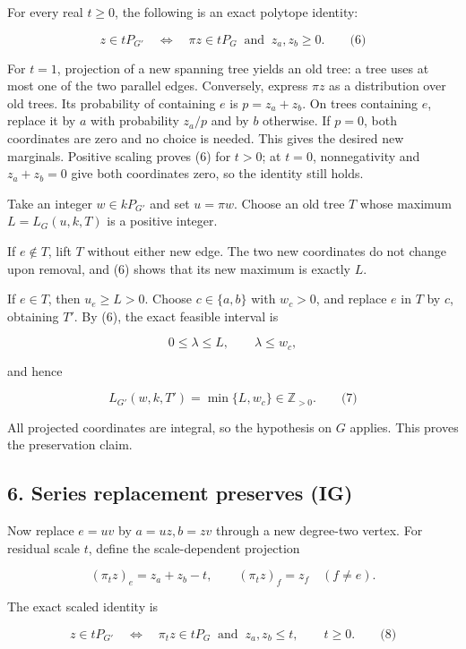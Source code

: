 \documentclass{article}
\begin{document}
For every real \(t\ge0\), the following is an exact polytope identity:

\[
z\in tP_{G'}\quad\Longleftrightarrow\quad
\pi z\in tP_G\ \text{ and }\ z_a,z_b\ge0.\qquad\text{(6)}
\]

For \(t=1\), projection of a new spanning tree yields an old tree: a tree uses at most one of the two parallel edges. Conversely, express \(\pi z\) as a distribution over old trees. Its probability of containing \(e\) is \(p=z_a+z_b\). On trees containing \(e\), replace it by \(a\) with probability \(z_a/p\) and by \(b\) otherwise. If \(p=0\), both coordinates are zero and no choice is needed. This gives the desired new marginals. Positive scaling proves (6) for \(t\gt 0\); at \(t=0\), nonnegativity and \(z_a+z_b=0\) give both coordinates zero, so the identity still holds.

Take an integer \(w\in kP_{G'}\) and set \(u=\pi w\). Choose an old tree \(T\) whose maximum \(L=L_G(u,k,T)\) is a positive integer.

If \(e\notin T\), lift \(T\) without either new edge. The two new coordinates do not change upon removal, and (6) shows that its new maximum is exactly \(L\).

If \(e\in T\), then \(u_e\ge L\gt 0\). Choose \(c\in\{a,b\}\) with \(w_c\gt 0\), and replace \(e\) in \(T\) by \(c\), obtaining \(T'\). By (6), the exact feasible interval is

\[
0\le\lambda\le L,\qquad \lambda\le w_c,
\]

and hence

\[
L_{G'}(w,k,T')=\min\{L,w_c\}\in\mathbb Z_{\gt 0}.\qquad\text{(7)}
\]

All projected coordinates are integral, so the hypothesis on \(G\) applies. This proves the preservation claim.

\subsection{6. Series replacement preserves (IG)}

Now replace \(e=uv\) by \(a=uz,b=zv\) through a new degree-two vertex. For residual scale \(t\), define the scale-dependent projection

\[
(\pi_t z)_e=z_a+z_b-t,\qquad
(\pi_t z)_f=z_f\quad(f\ne e).
\]

The exact scaled identity is

\[
z\in tP_{G'}\quad\Longleftrightarrow\quad
\pi_t z\in tP_G\ \text{ and }\ z_a,z_b\le t,
\qquad t\ge0.\qquad\text{(8)}
\]
\end{document}
